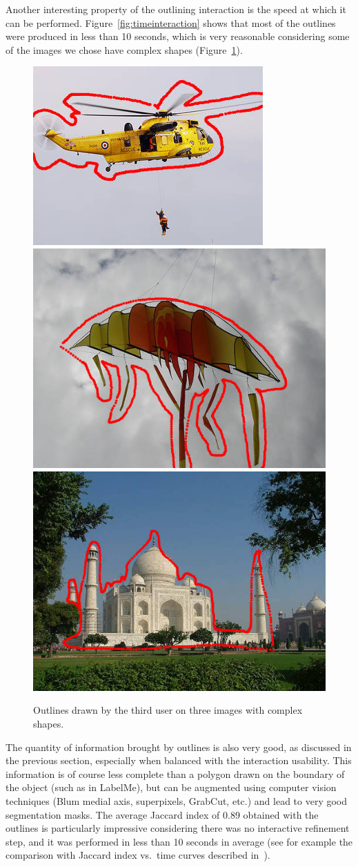 Another interesting property of the outlining interaction
is the speed at which it can be performed.
Figure~\ref{fig:timeinteraction} shows that most of the outlines
were produced in less than 10 seconds,
which is very reasonable considering some of the images we chose have
complex shapes (Figure~\ref{fig:complexoutlines}).


\begin{figure}[ht]
\includegraphics[width=0.31\columnwidth]{assets/img/helicopter_02_annot.jpg}\hfill
\includegraphics[width=0.32\columnwidth]{assets/img/kite_02_annot.jpg}\hfill
\includegraphics[width=0.32\columnwidth]{assets/img/taj_mahal_02_annot.jpg}
\caption{Outlines drawn by the third user on three images with complex shapes.}%
\label{fig:complexoutlines}
\end{figure}


The quantity of information brought by outlines is also very good,
as discussed in the previous section,
especially when balanced with the interaction usability.
This information is of course less complete than a polygon drawn
on the boundary of the object (such as in LabelMe),
but can be augmented using computer vision techniques (Blum medial axis,
superpixels, GrabCut, etc.) and lead to very good segmentation masks.
The average Jaccard index of 0.89 obtained with the outlines
is particularly impressive considering there was no interactive refinement step,
and it was performed in less than 10 seconds in average
(see for example the comparison with Jaccard index vs.\
time curves described in~\cite{carlier_clickncut:_2014}).


